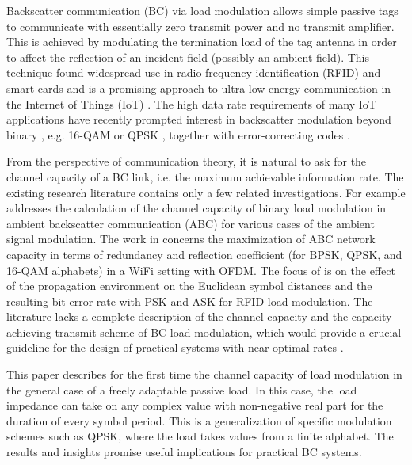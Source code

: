Backscatter communication (BC) via load modulation allows simple passive tags to communicate with essentially zero transmit power and no transmit amplifier. This is achieved by modulating the termination load of the tag antenna in order to affect the reflection of an incident field (possibly an ambient field). This technique found widespread use in radio-frequency identification (RFID) and smart cards \cite{Finkenzeller2015} and is a promising approach to ultra-low-energy communication in the Internet of Things (IoT) \cite{HuynhCST2018}. The high data rate requirements of many IoT applications have recently prompted interest in backscatter modulation beyond binary \cite[Tab.~III]{HuynhCST2018}, e.g. 16-QAM \cite{KimionisNAT2021} or QPSK \cite{WangMercierISSCC2020}, together with error-correcting codes \cite{HuynhCST2018}. %

From the perspective of communication theory, it is natural to ask for the channel capacity of a BC link, i.e. the maximum achievable information rate.
The existing research literature contains only a few related investigations. For example \cite{ZhaoACCESS2018} addresses the calculation of the channel capacity of binary load modulation in ambient backscatter communication (ABC) for various cases of the ambient signal modulation.
The work in \cite{KimSPAWC2017} concerns the maximization of ABC network capacity in terms of redundancy and reflection coefficient (for BPSK, QPSK, and 16-QAM alphabets) in a WiFi setting with OFDM. The focus of \cite{FuschiniAPL2008} is on the effect of the propagation environment on the Euclidean symbol distances and the resulting bit error rate with PSK and ASK for RFID load modulation.
The literature lacks a complete description of the channel capacity and the capacity-achieving transmit scheme of BC load modulation, which would provide a crucial guideline for the design of practical systems with near-optimal rates \cite{Tse2005}.

This paper describes for the first time the channel capacity of load modulation in the general case of a  freely adaptable passive load. In this case, the load impedance can take on any complex value with non-negative real part for the duration of every symbol period. %
This is a generalization of specific modulation schemes such as QPSK, where the load takes values from a finite alphabet. The results and insights promise useful implications for practical BC systems.

